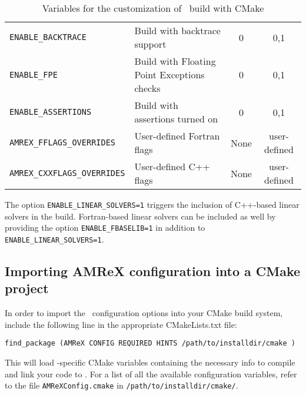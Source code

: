 \begin{table}[h!]
{\begin{tabular}{llcc}
    {\tt ENABLE\_BACKTRACE} & Build with backtrace support & 0  & 0,1 \\
    {\tt ENABLE\_FPE} & Build with Floating Point Exceptions checks & 0  & 0,1 \\
    {\tt ENABLE\_ASSERTIONS} & Build with assertions turned on  & 0  & 0,1 \\
    {\tt AMREX\_FFLAGS\_OVERRIDES} &  User-defined Fortran flags & None  & user-defined \\
    {\tt AMREX\_CXXFLAGS\_OVERRIDES} &  User-defined C++ flags & None  & user-defined \\
    \hline
  \end{tabular}
  }
  \caption{\label{tab:cmakevar} Variables for the customization of \amrex\ build with CMake}
\end{table}


The option {\tt ENABLE\_LINEAR\_SOLVERS=1} triggers the inclusion of C++-based linear
solvers in the build. Fortran-based linear solvers can be included
as well by providing  the option {\tt ENABLE\_FBASELIB=1} in addition
to  {\tt ENABLE\_LINEAR\_SOLVERS=1}.

\subsection{Importing AMReX configuration into a CMake project}
\label{sec:build:cmake:config}
In order to import the \amrex\ configuration options into your CMake
build system, include the following line in the appropriate
CMakeLists.txt file:
\begin{verbatim}
find_package (AMReX CONFIG REQUIRED HINTS /path/to/installdir/cmake )
\end{verbatim}
This will load \amrex-specific CMake variables containing the necessary
info to compile and link your code to \amrex. For a list of all the available
configuration variables, refer to the file {\tt AMReXConfig.cmake} in
{\tt /path/to/installdir/cmake/}.



